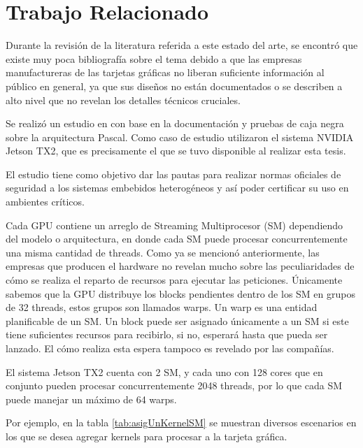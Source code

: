  \chapter{Trabajo Relacionado}
    \label{cha:TrabajoRelacionado}
   
  Durante la revisión de la literatura referida a este estado del arte, se encontró que existe muy poca bibliografía sobre el tema debido a que las empresas manufactureras de las tarjetas gráficas no liberan suficiente información al público en general, ya que sus diseños no están documentados o se describen a alto nivel que no revelan los detalles técnicos cruciales.
\newline

Se realizó un estudio en \cite{TX2-H} con base en la documentación y pruebas de caja negra sobre la arquitectura Pascal. Como caso de estudio utilizaron el sistema NVIDIA Jetson TX2, que es precisamente el que se tuvo disponible al realizar esta tesis.

El estudio tiene como objetivo dar las pautas para realizar normas oficiales de seguridad a los sistemas embebidos heterogéneos y así poder certificar su uso en ambientes críticos. 
\newline

Cada GPU contiene un arreglo de Streaming Multiprocesor (SM) dependiendo del modelo o arquitectura, en donde cada SM puede procesar concurrentemente una misma cantidad de threads. Como ya se mencionó anteriormente, las empresas que producen el hardware no revelan mucho sobre las peculiaridades de cómo se realiza el reparto de recursos para ejecutar las peticiones. Únicamente sabemos que la GPU distribuye los blocks pendientes dentro de los SM en grupos de 32 threads, estos grupos son llamados warps. Un warp es una entidad planificable de un SM.
Un block puede ser asignado únicamente a un SM si este tiene suficientes recursos para recibirlo, si no, esperará hasta que pueda ser lanzado. El cómo realiza esta espera tampoco es revelado por las compañías.
\newline

El sistema Jetson TX2 cuenta con 2 SM, y cada uno con 128 cores que en conjunto pueden procesar concurrentemente 2048 threads\cite{SMJetson}, por lo que cada SM puede manejar un máximo de 64 warps.
\newline

Por ejemplo, en la tabla \ref{tab:asigUnKernelSM} se muestran diversos escenarios en los que se desea agregar kernels para procesar a la tarjeta gráfica.
\newline

